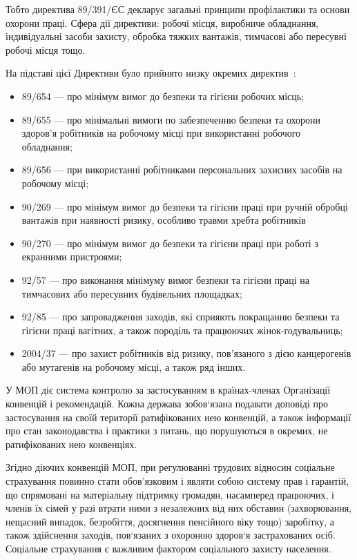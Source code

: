 Тобто директива 89/391/ЄС декларує загальні принципи профілактики та основи охорони праці. 
Сфера дії директиви: робочі місця, виробниче обладнання, індивідуальні засоби захисту, обробка тяжких вантажів, тимчасові або пересувні робочі місця тощо.

На підставі цієї Директиви було прийнято низку окремих директив~\cite{LectureOdessa}: 
\begin{itemize}
	\item 89/654 --- про мінімум вимог до безпеки та гігієни робочих місць;
	\item 89/655 --- про мінімальні вимоги по забезпеченню безпеки та охорони здоров’я робітників на робочому місці при використанні робочого обладнання; 
	\item 89/656 --- при використанні робітниками персональних захисних засобів на робочому місці; 
	\item 90/269 --- про мінімум вимог до безпеки та гігієни праці при ручній обробці вантажів при наявності ризику, особливо травми хребта робітників
	\item 90/270 --- про мінімум вимог до безпеки та гігієни праці при роботі з екранними пристроями; 
	\item 92/57 --- про виконання мінімуму вимог безпеки та гігієни праці на тимчасових або пересувних будівельних площадках; 
	\item 92/85 --- про запровадження заходів, які сприяють покращанню безпеки та гігієни праці вагітних, а також породіль та працюючих жінок-годувальниць; 
	\item 2004/37 --- про захист робітників від ризику, пов’язаного з дією канцерогенів або мутагенів на робочому місці, а також ряд інших.
\end{itemize}

У МОП діє система контролю за застосуванням в країнах-членах Організації конвенцій і рекомендацій. 
Кожна держава зобов‘язана подавати доповіді про застосування на своїй території ратифікованих нею конвенцій, а також інформації про стан законодавства і практики з питань, що порушуються в окремих, не ратифікованих нею конвенціях.

Згідно діючих конвенцій МОП, при регулюванні трудових відносин соціальне страхування повинно стати обов’язковим і являти собою систему прав і гарантій, що спрямовані на матеріальну підтримку громадян, насамперед працюючих, і членів їх сімей у разі втрати ними з незалежних від них обставин (захворювання, нещасний випадок, безробіття, досягнення пенсійного віку тощо) заробітку, а також здійснення заходів, пов‘язаних з охороною здоров‘я застрахованих осіб. 
Соціальне страхування є важливим фактором соціального захисту населення.




